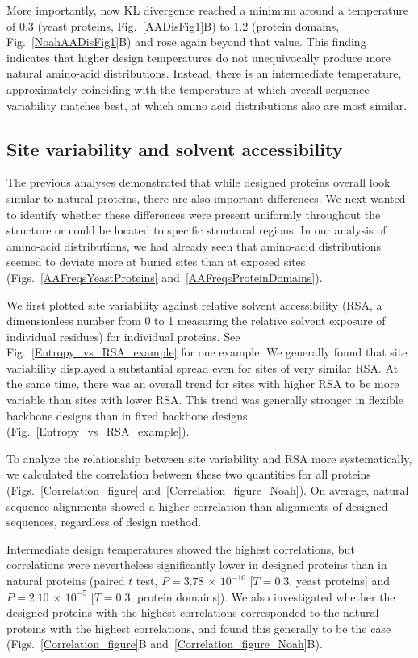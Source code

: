 \documentclass[12pt]{article}
\begin{document}
More importantly, now KL divergence reached a minimum around a temperature of 0.3 (yeast proteins, Fig.~\ref{AADisFig1}B) to 1.2 (protein domains, Fig.~\ref{NoahAADisFig1}B) and rose again beyond that value. This finding indicates that higher design temperatures do not unequivocally produce more natural amino-acid distributions. Instead, there is an intermediate temperature, approximately coinciding with the temperature at which overall sequence variability matches best, at which amino acid distributions also are most similar.

\subsection{Site variability and solvent accessibility}
\label{ProteinStructure}

The previous analyses demonstrated that while designed proteins overall look similar to natural proteins, there are also important differences. We next wanted to identify whether these differences were present uniformly throughout the structure or could be located to specific structural regions. In our analysis of amino-acid distributions, we had already seen that amino-acid distributions seemed to deviate more at buried sites than at exposed sites (Figs.~\ref{AAFreqsYeastProteins} and~\ref{AAFreqsProteinDomains}).

We first plotted site variability against relative solvent accessibility (RSA, a dimensionless number from 0 to 1 measuring the relative solvent exposure of individual residues) for individual proteins. See Fig.~\ref{Entropy_vs_RSA_example} for one example. We generally found that site variability displayed a substantial spread even for sites of very similar RSA. At the same time, there was an overall trend for sites with higher RSA to be more variable than sites with lower RSA. This trend was generally stronger in flexible backbone designs than in fixed backbone designs (Fig.~\ref{Entropy_vs_RSA_example}).

To analyze the relationship between site variability and RSA more systematically, we calculated the correlation between these two quantities for all proteins (Figs.~\ref{Correlation_figure} and~\ref{Correlation_figure_Noah}). On average, natural sequence alignments showed a higher correlation than alignments of designed sequences, regardless of design method. 

Intermediate design temperatures showed the highest correlations, but correlations were nevertheless significantly lower in designed proteins than in natural proteins (paired $t$ test, $P=  3.78$  $\times$  $10^{-10}$ [$T=0.3$, yeast proteins] and $P= 2.10$ $\times$  $10^{-5} $ [$T=0.3$, protein domains]).  We also investigated whether the designed proteins with the highest correlations corresponded to the natural proteins with the highest correlations, and found this generally to be the case (Figs.~\ref{Correlation_figure}B and~\ref{Correlation_figure_Noah}B).
\end{document}
